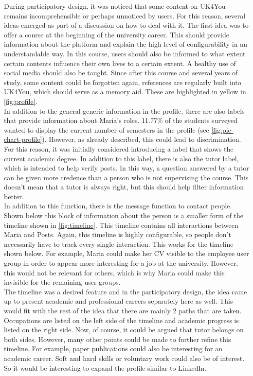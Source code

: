 During participatory design, it was noticed that some content on UK4You remains incomprehensible or perhaps unnoticed by users.
For this reason, several ideas emerged as part of a discussion on how to deal with it.
The first idea was to offer a course at the beginning of the university career.
This should provide information about the platform and explain the high level of configurability in an understandable way.
In this course, users should also be informed to what extent certain contents influence their own lives to a certain extent.
A healthy use of social media should also be taught.
Since after this course and several years of study, some content could be forgotten again, references are regularly built into UK4You, which should serve as a memory aid.
These are highlighted in yellow in \autoref{fig:profile}.\\

In addition to the general generic information in the profile, there are also labels that provide information about Maria's roles.
11.77\% of the students surveyed wanted to display the current number of semesters in the profile (see \autoref{fig:pie-chart-profile}).
However, as already described, this could lead to discrimination.
For this reason, it was initially considered introducing a label that shows the current academic degree.
In addition to this label, there is also the tutor label, which is intended to help verify posts.
In this way, a question answered by a tutor can be given more credence than a person who is not supervising the course.
This doesn't mean that a tutor is always right, but this should help filter information better.\\

In addition to this function, there is the message function to contact people.
Shown below this block of information about the person is a smaller form of the timeline shown in \autoref{fig:timeline}.
This timeline contains all interactions between Maria and Posts.
Again, this timeline is highly configurable, so people don't necessarily have to track every single interaction.
This works for the timeline shown below.
For example, Maria could make her CV visible to the employee user group in order to appear more interesting for a job at the university.
However, this would not be relevant for others, which is why Maria could make this invisible for the remaining user groups.\\

The timeline was a desired feature and in the participatory design, the idea came up to present academic and professional careers separately here as well.
This would fit with the rest of the idea that there are mainly 2 paths that are taken.
Occupations are listed on the left side of the timeline and academic progress is listed on the right side.
Now, of course, it could be argued that tutor belongs on both sides.
However, many other points could be made to further refine this timeline.
For example, paper publications could also be interesting for an academic career.
Soft and hard skills or voluntary work could also be of interest.
So it would be interesting to expand the profile similar to LinkedIn.\\

